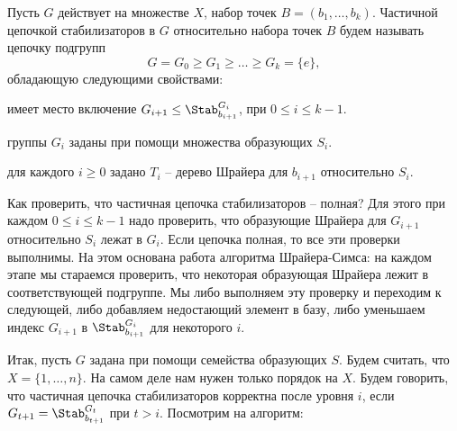 Пусть $G$ действует на множестве $X$, набор точек $B=(b_1,\dots,b_k)$. Частичной цепочкой стабилизаторов в $G$ относительно набора точек $B$ будем называть цепочку подгрупп 
$$G=G_0\geq G_1 \geq \dots \geq G_k=\{e\},$$
обладающую следующими свойствами:
\enm
\item имеет место включение $G_{i+1}\leq \Stab_{b_{i+1}}^{G_i}$, при $0\leq i\leq k-1$.
\item группы $G_i$ заданы при помощи множества образующих $S_i$.
\item для каждого $i\geq 0$ задано $T_i$ -- дерево Шрайера для $b_{i+1}$ относительно $S_i$.
\eenm
\edfn

Как проверить, что частичная цепочка стабилизаторов -- полная? Для этого при каждом $0\leq i\leq k-1$ надо проверить, что образующие Шрайера для $G_{i+1}$ относительно $S_i$ лежат в $G_i$. Если цепочка полная, то все эти проверки выполнимы. На этом основана работа алгоритма Шрайера-Симса: на каждом этапе мы стараемся проверить, что некоторая образующая Шрайера лежит в соответствующей подгруппе. Мы либо выполняем эту проверку и переходим к следующей, либо добавляем недостающий элемент в базу, либо уменьшаем индекс $G_{i+1}$ в $\Stab_{b_{i+1}}^{G_i}$ для некоторого $i$. 

Итак, пусть $G$ задана при помощи семейства образующих $S$. Будем считать, что $X=\{1,\dots,n\}$. На самом деле нам нужен только порядок на $X$. Будем говорить, что частичная цепочка стабилизаторов корректна после уровня $i$, если $G_{t+1}=\Stab_{b_{t+1}}^{G_t}$ при $t> i$. Посмотрим на алгоритм:

